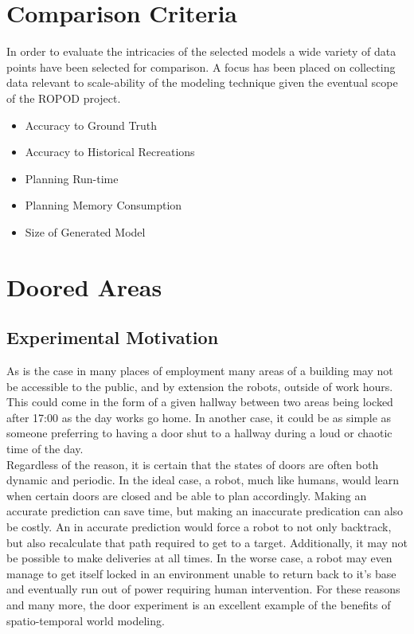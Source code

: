 \section{ Comparison Criteria }
In order to evaluate the intricacies of the selected models a wide variety of
data points have been selected for comparison. A focus has been placed on collecting
data relevant to scale-ability of the modeling technique given the eventual scope of the ROPOD project.

\begin{itemize}

  \item Accuracy to Ground Truth

  \item Accuracy to Historical Recreations

  \item Planning Run-time

  \item Planning Memory Consumption

  \item Size of Generated Model

\end{itemize}


\section{ Doored Areas}

\subsection{ Experimental Motivation }

As is the case in many places of employment many areas of a building may not
be accessible to the public, and by extension the robots, outside of work
hours.  This could come in the form of a given hallway between two areas being
locked after 17:00 as the day works go home. In another case, it could be as
simple as someone preferring to having a door shut to a hallway during a loud
or chaotic time of the day. \\

Regardless of the reason, it is certain that the states of doors are often
both dynamic and periodic. In the ideal case, a robot, much like humans,
would learn when certain doors are closed and be able to plan accordingly.
Making an accurate prediction can save time, but making an inaccurate
predication can also be costly. An in accurate prediction would force a robot
to not only backtrack, but also recalculate that path required to get to a
target. Additionally, it may not be possible to make deliveries at all times.
In the worse case, a robot may even manage to get itself locked in an
environment unable to return back to it's base and eventually run out of power
requiring human intervention. For these reasons and many more, the door
experiment is an excellent example of the benefits of spatio-temporal world
modeling. \\


